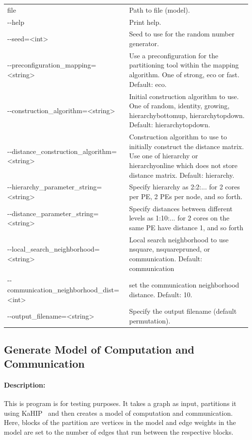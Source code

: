 \documentclass[11pt]{article}
\begin{document}
\begin{tabularx}{\textwidth}{lX}
  file                                  & Path to file (model). \\
  -{}-help                      & Print help. \\ 
  -{}-seed=<int>                & Seed to use for the random number generator. \\
  -{}-preconfiguration\_mapping=<string> &    Use a preconfiguration for the partitioning tool within the mapping algorithm. One of strong, eco or fast. Default: eco. \\
  -{}-construction\_algorithm=<string>  &       Initial construction algorithm to use. One of random, identity, growing, hierarchybottomup, hierarchytopdown. Default: hierarchytopdown. \\
  -{}-distance\_construction\_algorithm=<string> & Construction algorithm to use to initially construct the distance matrix. Use one of hierarchy or hierarchyonline which does not store distance matrix. Default: hierarchy. \\
  -{}-hierarchy\_parameter\_string=<string> &   Specify hierarchy as 2:2:... for 2 cores per PE, 2 PEs per node, and so forth. \\
  -{}-distance\_parameter\_string=<string>  &   Specify distances between different levels as 1:10:... for 2 cores on the same PE have distance 1, and so forth \\
  -{}-local\_search\_neighborhood=<string>     & Local search neighborhood to use nsquare, nsquarepruned, or communication. Default: communication \\
  -{}-communication\_neighborhood\_dist=<int>  & set the communication neighborhood distance. Default: 10. \\
  -{}-output\_filename=<string> & Specify the output filename (default permutation). \\
\end{tabularx}
\vfill
\pagebreak
\subsection{Generate Model of Computation and Communication}
\paragraph*{Description:} This is program is for testing purposes. It takes a graph as input, partitions it using KaHIP~\cite{kaHIPHomePage,DBLP:journals/corr/SandersS13} and then creates a model of computation and communication. Here, blocks of the partition are vertices in the model and edge weights in the model are set to the number of edges that run between the respective blocks.
\end{document}
